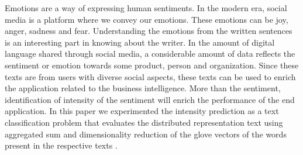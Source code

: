 Emotions are a way of expressing human sentiments. In the modern era, social media is a platform where we convey our emotions. These emotions can be joy, anger, sadness and fear. Understanding the emotions from the written sentences is an interesting part in knowing about the writer. In the amount of digital language shared through social media, a considerable amount of data reflects the sentiment or emotion towards some product, person and organization. Since these texts are from users with diverse social aspects, these texts can be used to enrich the application related to the business intelligence. More than the sentiment, identification of intensity of the sentiment will enrich the performance of the end application. In this paper we experimented the intensity prediction as a text classification problem that evaluates the distributed representation text using aggregated sum and dimensionality reduction of the glove vectors of the words present in the respective texts .

